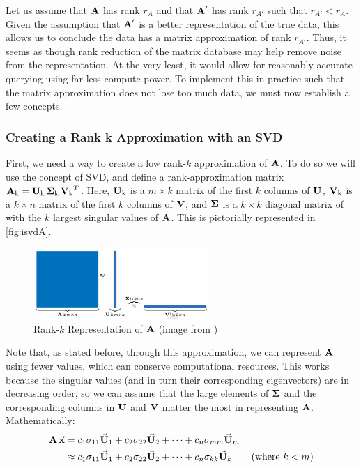 Let us assume that $\operatorname{\mathbf{A}}$ has rank $r_A$ and that $\operatorname{\mathbf{A}}'$ has rank $r_{A'}$ such 
that $r_{A'} < r_A$. Given the assumption that $\operatorname{\mathbf{A}}'$ is a better representation of the true data, this allows us to conclude the data has a matrix approximation of rank $r_{A'}$. Thus, it seems as though 
rank reduction of the matrix database may help remove noise from the representation. 
At the very least, it would allow for reasonably accurate querying using far less compute power.
To implement this in practice such that the matrix approximation does not lose too much data, we must now establish a few concepts. 

\subsubsection{Creating a Rank k Approximation with an SVD}
First, we need a way to create a low rank-$k$ approximation of $\operatorname{\mathbf{A}}$. To do so we will use the concept of SVD, and define a rank-approximation matrix $\operatorname{\mathbf{A}_k} = \operatorname{\mathbf{U}_k}\operatorname{\mathbf{\Sigma}_k}\operatorname{\mathbf{V}_k}^T$. Here, $\operatorname{\mathbf{U}_k}$ is a $m \times k$ matrix of the first $k$ columns  of $\operatorname{\mathbf{U}}$, $\operatorname{\mathbf{V}_k}$ is a  $k \times n$ matrix of the first $k$ columns of $\operatorname{\mathbf{V}}$, and $\operatorname{\mathbf{\Sigma}}$ is a $k \times k$ diagonal matrix of with the $k$ largest singular values of $\operatorname{\mathbf{A}}$. This is pictorially represented in \autoref{fig:isvdA}.
\begin{figure}[H]
    \centering
    \includegraphics[width=0.6\textwidth]{./imgs/ISVD.jpg}
    \caption{Rank-$k$ Representation of $\operatorname{\mathbf{A}}$ (image from \cite{svdImage})}
    \label{fig:isvdA}
\end{figure}
 Note that, as stated before, through this approximation, we can represent $\operatorname{\mathbf{A}}$ using fewer values, which can conserve computational resources.
This works because the singular values (and in turn their corresponding eigenvectors) are in decreasing order, so we can assume that the large elements of $\operatorname{\mathbf{\Sigma}}$ and the corresponding columns in $\operatorname{\mathbf{U}}$ and $\operatorname{\mathbf{V}}$ matter the most in representing $\operatorname{\mathbf{A}}$. Mathematically:
 \begin{align*}
     \operatorname{\mathbf{A}}\vec{\mathbf{x}} &= c_1\sigma_{11}\vec{\mathbf{U}}_1 +  c_2\sigma_{22}\vec{\mathbf{U}}_2 + \dots + c_n\sigma_{mm}\vec{\mathbf{U}}_m \\
     &\approx c_1\sigma_{11}\vec{\mathbf{U}}_1 +  c_2\sigma_{22}\vec{\mathbf{U}}_2 + \dots + c_n\sigma_{kk}\vec{\mathbf{U}}_k \tag{where $k < m$} 
 \end{align*}

